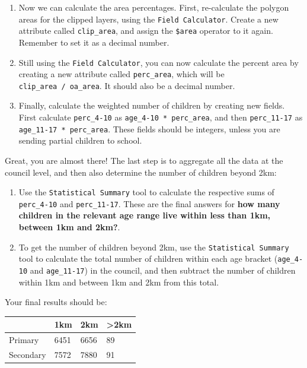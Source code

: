 \documentclass[
  letterpaper,
  DIV=11,
  numbers=noendperiod]{scrreprt}
\begin{document}
\begin{enumerate}
\def\labelenumi{(\arabic{enumi})}
\setcounter{enumi}{295}
\item
  Now we can calculate the area percentages. First, re-calculate the
  polygon areas for the clipped layers, using the
  \texttt{Field\ Calculator}. Create a new attribute called
  \texttt{clip\_area}, and assign the \texttt{\$area} operator to it
  again. Remember to set it as a decimal number.
\item
  Still using the \texttt{Field\ Calculator}, you can now calculate the
  percent area by creating a new attribute called \texttt{perc\_area},
  which will be \texttt{clip\_area\ /\ oa\_area}. It should also be a
  decimal number.
\item
  Finally, calculate the weighted number of children by creating new
  fields. First calculate \texttt{perc\_4-10} as
  \texttt{age\_4-10\ *\ perc\_area}, and then \texttt{perc\_11-17} as
  \texttt{age\_11-17\ *\ perc\_area}. These fields should be integers,
  unless you are sending partial children to school.
\end{enumerate}

Great, you are almost there! The last step is to aggregate all the data
at the council level, and then also determine the number of children
beyond 2km:

\begin{enumerate}
\def\labelenumi{(\arabic{enumi})}
\setcounter{enumi}{298}
\item
  Use the \texttt{Statistical\ Summary} tool to calculate the respective
  sums of \texttt{perc\_4-10} and \texttt{perc\_11-17}. These are the
  final answers for \textbf{how many children in the relevant age range
  live within less than 1km, between 1km and 2km?}.
\item
  To get the number of children beyond 2km, use the
  \texttt{Statistical\ Summary} tool to calculate the total number of
  children within each age bracket (\texttt{age\_4-10} and
  \texttt{age\_11-17}) in the council, and then subtract the number of
  children within 1km and between 1km and 2km from this total.
\end{enumerate}

Your final results should be:

\begin{longtable}[]{@{}llll@{}}
\toprule\noalign{}
& 1km & 2km & \textgreater2km \\
\midrule\noalign{}
\endhead
\bottomrule\noalign{}
\endlastfoot
Primary & 6451 & 6656 & 89 \\
Secondary & 7572 & 7880 & 91 \\
\end{longtable}
\end{document}
